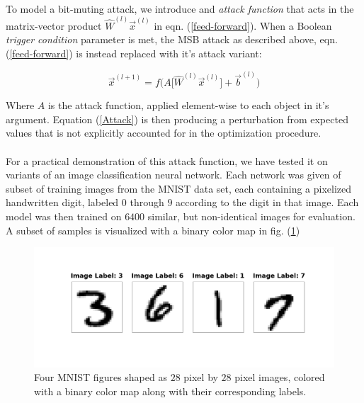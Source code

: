 \documentclass[12pt,letterpaper]{article}
\begin{document}
\paragraph*{}To model a bit-muting attack, we introduce and \textit{attack function} that acts in the matrix-vector product 
$\hat{W}^{(l)} \vec{x}^{(l)}$ in eqn. (\ref{feed-forward}). When a Boolean \textit{trigger condition} parameter is met, the MSB attack as described above, eqn. (\ref{feed-forward}) is instead replaced with it's attack variant:

\begin{equation}
\label{Attack}
\vec{x}^{(l+1)} = f \Big( A \big[ \hat{W}^{(l)} \vec{x}^{(l)} \big] + \vec{b}^{(l)} \Big)
\end{equation}

Where $A$ is the attack function, applied element-wise to each object in it's argument. Equation (\ref{Attack}) is then producing a perturbation from expected values that is not explicitly accounted for in the optimization procedure.

\paragraph*{}For a practical demonstration of this attack function, we have tested it on variants of an image classification neural network. Each network was given of subset of training images from the MNIST data set, each containing a pixelized handwritten digit, labeled $0$ through $9$ according to the digit in that image. Each model was then trained on $6400$ similar, but non-identical images for evaluation. A subset of samples is visualized with a binary color map in fig. (\ref{MNIST})

\begin{figure}[h]
	\label{MNIST}
	\centering
	\includegraphics[scale=0.3]{MNIST}
	\caption{Four MNIST figures shaped as $28$ pixel by $28$ pixel images, colored with a binary color map along with their corresponding labels.}
\end{figure}
\end{document}
